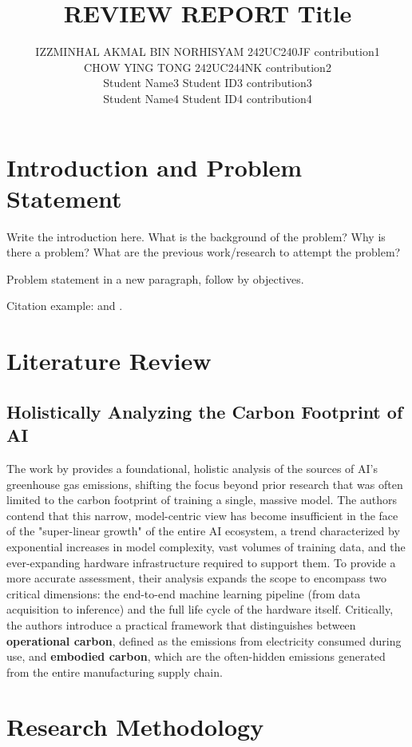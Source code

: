 \documentclass[a4paper, 12pt]{article}
\author{
IZZMINHAL AKMAL BIN NORHISYAM \quad 242UC240JF \quad contribution1 \\
CHOW YING TONG \quad 242UC244NK \quad contribution2\\
Student Name3 \quad Student ID3 \quad contribution3\\
Student Name4 \quad Student ID4 \quad contribution4\\
}
\title{ REVIEW REPORT  Title  }
\begin{document}
\maketitle


\section{Introduction and Problem Statement}
Write the introduction here. What is the background of the problem? Why is there a problem? What are the previous work/research to attempt the problem? 

Problem statement in a new paragraph, follow by objectives.

Citation example: \cite{Termenchy15} and \cite{Jones19}.

\section{Literature Review}
\subsection{Holistically Analyzing the Carbon Footprint of AI}
\hspace{24pt}The work by \textcite{Wu2022} provides a foundational, holistic analysis of the sources of AI's greenhouse gas emissions, shifting the focus beyond prior research that was often limited to the carbon footprint of training a single, massive model. The authors contend that this narrow, model-centric view has become insufficient in the face of the "super-linear growth" of the entire AI ecosystem, a trend characterized by exponential increases in model complexity, vast volumes of training data, and the ever-expanding hardware infrastructure required to support them. To provide a more accurate assessment, their analysis expands the scope to encompass two critical dimensions: the end-to-end machine learning pipeline (from data acquisition to inference) and the full life cycle of the hardware itself. Critically, the authors introduce a practical framework that distinguishes between \textbf{operational carbon}, defined as the emissions from electricity consumed during use, and \textbf{embodied carbon}, which are the often-hidden emissions generated from the entire manufacturing supply chain.

\section{Research Methodology}
\end{document}
